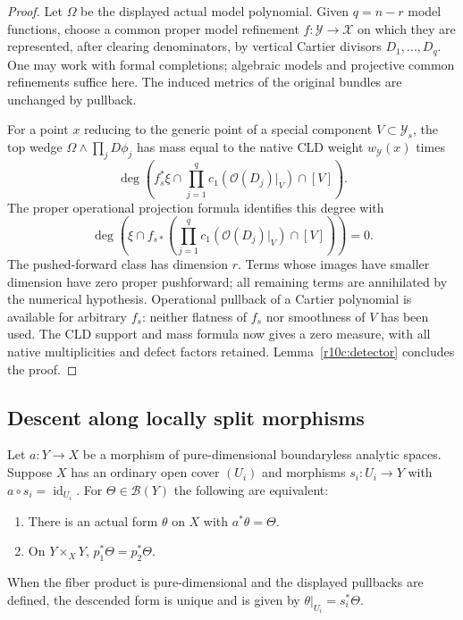 \begin{proof}
Let $\Omega$ be the displayed actual model polynomial.  Given $q=n-r$
model functions, choose a common proper model refinement
$f:\mathcal Y\to\mathcal X$ on which they are represented, after
clearing denominators, by vertical Cartier divisors $D_1,\ldots,D_q$.
One may work with formal completions; algebraic models and projective
common refinements suffice here.  The induced metrics of the original
bundles are unchanged by pullback.

For a point $x$ reducing to the generic point of a special component
$V\subset\mathcal Y_s$, the top wedge
$\Omega\wedge\prod_jD\phi_j$ has mass equal to the native CLD weight
$w_{\mathcal Y}(x)$ times
\[
 \deg\left(f_s^*\xi\cap
       \prod_{j=1}^{q}c_1(\mathcal O(D_j)|_V)\cap[V]\right).
\]
The proper operational projection formula identifies this degree with
\[
 \deg\left(\xi\cap f_{s*}
       \left(\prod_{j=1}^{q}c_1(\mathcal O(D_j)|_V)\cap[V]\right)\right)=0.
\]
The pushed-forward class has dimension $r$.  Terms whose images have
smaller dimension have zero proper pushforward; all remaining terms are
annihilated by the numerical hypothesis.  Operational pullback of a
Cartier polynomial is available for arbitrary $f_s$: neither flatness of
$f_s$ nor smoothness of $V$ has been used.  The CLD support and mass
formula now gives a zero measure, with all native multiplicities and
defect factors retained.  Lemma~\ref{r10c:detector} concludes the proof.
\end{proof}

\subsection{Descent along locally split morphisms}

\begin{lemma}
\label{r10c:split-descent}
Let $a:Y\to X$ be a morphism of pure-dimensional boundaryless analytic
spaces.  Suppose $X$ has an ordinary open cover $(U_i)$ and morphisms
$s_i:U_i\to Y$ with $a\circ s_i=\operatorname{id}_{U_i}$.
For $\Theta\in\mathcal B(Y)$ the following are equivalent:
\begin{enumerate}
\item There is an actual form $\theta$ on $X$ with $a^*\theta=\Theta$.
\item On $Y\times_XY$, $p_1^*\Theta=p_2^*\Theta$.
\end{enumerate}
When the fiber product is pure-dimensional and the displayed pullbacks
are defined, the descended form is unique and is given by
$\theta|_{U_i}=s_i^*\Theta$.
\end{lemma}

